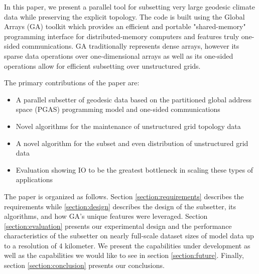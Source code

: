 In this paper, we present a parallel tool for subsetting very large geodesic
climate data while preserving the explicit topology.  The code is built using
the Global Arrays (GA) toolkit\cite{GA} which provides an efficient and
portable "shared-memory" programming interface for distributed-memory
computers and features truly one-sided communications.  GA traditionally
represents dense arrays, however its sparse data operations over
one-dimensional arrays as well as its one-sided operations allow for efficient
subsetting over unstructured grids.

The primary contributions of the paper are:
\begin{itemize}
\item A parallel subsetter of geodesic data based on the partitioned global
address space (PGAS) programming model and one-sided communications
\item Novel algorithms for the maintenance of unstructured grid topology data
\item A novel algorithm for the subset and even distribution of unstructured grid data
\item Evaluation showing IO to be the greatest bottleneck in scaling these types of applications
\end{itemize}

The paper is organized as follows.  Section \ref{section:requirements}
describes the requirements while \ref{section:design} describes the design of
the subsetter, its algorithms, and how GA's unique features were leveraged.
Section \ref{section:evaluation} presents our experimental design and the
performance characteristics of the subsetter on nearly full-scale dataset
sizes of model data up to a resolution of 4 kilometer.  We present the
capabilities under development as well as the capabilities we would like to
see in section \ref{section:future}.  Finally, section
\ref{section:conclusion} presents our conclusions.
